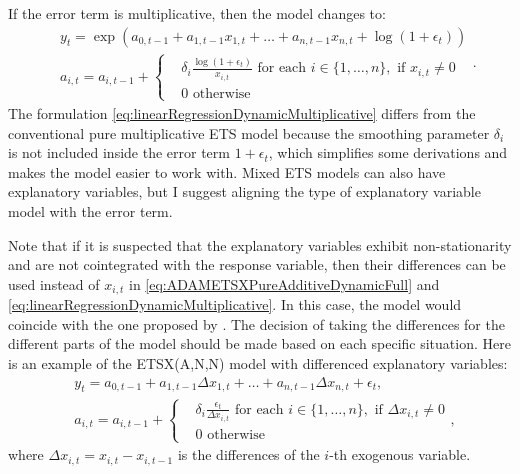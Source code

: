 \documentclass[
]{book}
\theoremstyle{definition}
\theoremstyle{definition}
\theoremstyle{definition}
\theoremstyle{definition}
\theoremstyle{remark}
\begin{document}
If the error term is multiplicative, then the model changes to:
\begin{equation}
  \begin{aligned}
    & y_{t} = \exp \left(a_{0,t-1} + a_{1,t-1} x_{1,t} + \dots + a_{n,t-1} x_{n,t} + \log(1+ \epsilon_t) \right) \\
    & a_{i,t} = a_{i,t-1} + \left \lbrace \begin{aligned}
                  &\delta_i \frac{\log(1+\epsilon_t)}{x_{i,t}} \text{ for each } i \in \{1, \dots, n\}, \text{ if } x_{i,t}\neq 0 \\
                  &0 \text{ otherwise }
            \end{aligned} \right.
  \end{aligned} .
  \label{eq:linearRegressionDynamicMultiplicative}
\end{equation}
The formulation \eqref{eq:linearRegressionDynamicMultiplicative} differs from the conventional pure multiplicative ETS model because the smoothing parameter \(\delta_i\) is not included inside the error term \(1+\epsilon_t\), which simplifies some derivations and makes the model easier to work with. Mixed ETS models can also have explanatory variables, but I suggest aligning the type of explanatory variable model with the error term.

Note that if it is suspected that the explanatory variables exhibit non-stationarity and are not cointegrated with the response variable, then their differences can be used instead of \(x_{i,t}\) in \eqref{eq:ADAMETSXPureAdditiveDynamicFull} and \eqref{eq:linearRegressionDynamicMultiplicative}. In this case, the model would coincide with the one proposed by \citet{Osman2015}. The decision of taking the differences for the different parts of the model should be made based on each specific situation. Here is an example of the ETSX(A,N,N) model with differenced explanatory variables:
\begin{equation}
  \begin{aligned}
    & y_{t} = a_{0,t-1} + a_{1,t-1} \Delta x_{1,t} + \dots + a_{n,t-1} \Delta x_{n,t} + \epsilon_t , \\
    & a_{i,t} = a_{i,t-1} + \left \lbrace \begin{aligned}
                  &\delta_i \frac{\epsilon_t}{\Delta x_{i,t}} \text{ for each } i \in \{1, \dots, n\}, \text{ if } \Delta x_{i,t}\neq 0 \\
                  &0 \text{ otherwise }
            \end{aligned} \right. ,
  \end{aligned}
  \label{eq:linearRegressionDynamicDifferences}
\end{equation}
where \(\Delta x_{i,t} = x_{i,t} -x_{i,t-1}\) is the differences of the \(i\)-th exogenous variable.
\end{document}
